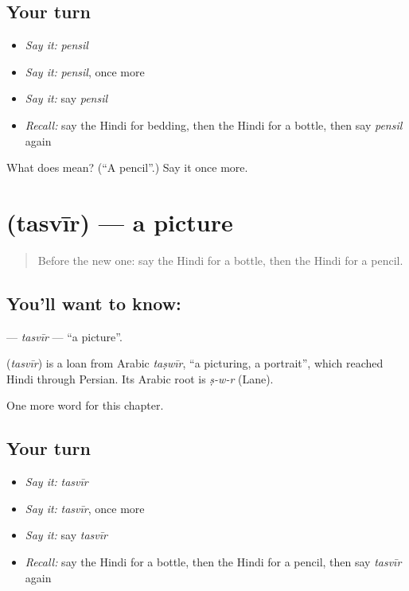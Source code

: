 \subsection*{Your turn}
\begin{itemize}
\raggedright
  \item \emph{Say it:} \emph{pensil}
  \item \emph{Say it:} \emph{pensil}, once more
  \item \emph{Say it:} say \emph{pensil}
  \item \emph{Recall:} say the Hindi for bedding, then the Hindi for a bottle, then say \emph{pensil} again
\end{itemize}

\begin{tcolorbox}[breakable,colback=teal!4,colframe=teal!35!black,title={Before you move on}]
What does  mean? (\textquotedblleft{}A pencil\textquotedblright{}.) Say it once more.
\end{tcolorbox}
\section[\texorpdfstring{\hi{तस्वीर} (tasvīr)}{तस्वीर (tasvīr)}]{ (tasvīr) — a picture}

\label{lesson:HI-C134-tasvir}



\begin{quote}
Before the new one: say the Hindi for a bottle, then the Hindi for a pencil.
\end{quote}

\subsection*{You'll want to know: }
\textbf{} — \emph{tasvīr} — \textquotedblleft{}a picture\textquotedblright{}.

\begin{cousinweb}
\textbf{} (\emph{tasvīr}) is a loan from Arabic \emph{taṣwīr}, \textquotedblleft{}a picturing, a portrait\textquotedblright{}, which reached Hindi through Persian. Its Arabic root is \emph{ṣ-w-r} (Lane).
\end{cousinweb}

\begin{grammarlens}[title={What you've built}]
One more word for this chapter.
\end{grammarlens}

\subsection*{Your turn}
\begin{itemize}
\raggedright
  \item \emph{Say it:} \emph{tasvīr}
  \item \emph{Say it:} \emph{tasvīr}, once more
  \item \emph{Say it:} say \emph{tasvīr}
  \item \emph{Recall:} say the Hindi for a bottle, then the Hindi for a pencil, then say \emph{tasvīr} again
\end{itemize}

